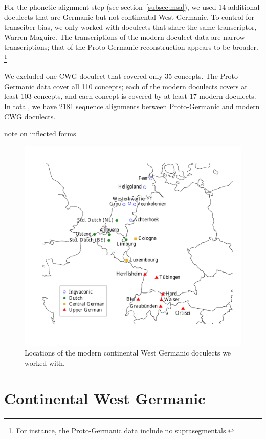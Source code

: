 \documentclass[a4paper]{article}
\begin{document}
For the phonetic alignment step (see section~\ref{subsec:msa}),
we used 14 additional doculects that are Germanic but not continental West Germanic. 
To control for transciber bias,
we only worked with doculects that share the same transcriptor,
Warren Maguire.
The transcriptions of the modern doculect data
are narrow transcriptions;
that of the Proto-Germanic reconstruction appears to be broader.
\footnote{
For instance, the Proto-Germanic data include no suprasegmentals.
}

We excluded one CWG doculect that covered only 35 concepts. %
The Proto-Germanic data cover all 110 concepts; each of the modern doculects covers at least 103 concepts, and each concept is covered by at least 17 modern doculects.
In total, we have 2181 sequence alignments between Proto-Germanic and modern CWG doculects.

note on inflected forms

\begin{figure}[h]
\centering
\includegraphics[width=\textwidth]{figures/map.pdf}
\caption{Locations of the modern continental West Germanic doculects we worked with.}
\label{fig:map}
\end{figure}


\section{Continental West Germanic}
\label{sec:cwg}
\end{document}
